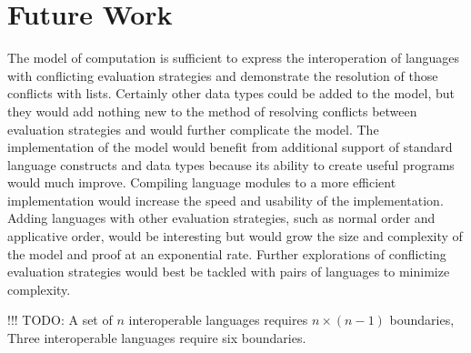 \chapter{Future Work}

The model of computation is sufficient to express the interoperation of languages with conflicting evaluation strategies and demonstrate the resolution of those conflicts with lists.  Certainly other data types could be added to the model, but they would add nothing new to the method of resolving conflicts between evaluation strategies and would further complicate the model.  The implementation of the model would benefit from additional support of standard language constructs and data types because its ability to create useful programs would much improve.  Compiling language modules to a more efficient implementation would increase the speed and usability of the implementation.  Adding languages with other evaluation strategies, such as normal order and applicative order, would be interesting but would grow the size and complexity of the model and proof at an exponential rate.  Further explorations of conflicting evaluation strategies would best be tackled with pairs of languages to minimize complexity.

!!! TODO: A set of $n$ interoperable languages requires $n\times(n-1)$ boundaries, Three interoperable languages require six boundaries.